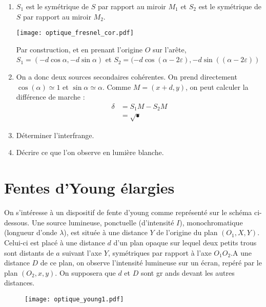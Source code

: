 \begin{correction}

\begin{enumerate}

	\item $S_1$ est le symétrique de $S$ par rapport au miroir $M_1$ et $S_2$ est le symétrique de $S$ par rapport au miroir $M_2$. 
	
\texttt{[image: optique\_fresnel\_cor.pdf]}

Par construction, et en prenant l'origine $O$ sur l'arête, $S_1=(-d\cos\alpha,-d\sin\alpha)$ et $S_2=(-d\cos(\alpha-2\varepsilon),-d\sin((\alpha-2\varepsilon))$
	
	\item On a donc deux sources secondaires cohérentes. On prend directement $\cos(\alpha)\simeq1$ et $\sin\alpha\simeq\alpha$. Comme $M=(x+d,y)$, on peut calculer la différence de marche :
	\begin{align*}
		\delta &= S_1M-S_2M \\
		&=\sqrt{•}
	\end{align*}
	
	\item Déterminer l'interfrange.
	
	\item Décrire ce que l'on observe en lumière blanche.

\end{enumerate}

\end{correction}

\newpage

\section{Fentes d'Young élargies}

On s'intéresse à un dispositif de fente d'young comme représenté sur le schéma ci-dessous. Une source lumineuse, ponctuelle (d'intensité $I$), monochromatique (longueur d'onde $\lambda$), est située à une distance $Y$ de l'origine du plan $(O_1,X,Y)$. Celui-ci est placé à une distance $d$ d'un plan opaque sur lequel deux petits trous sont distants de $a$ suivant l'axe $Y$, symétriques par rapport à l'axe $O_1O_2$.A une distance $D$ de ce plan, on observe l'intensité lumineuse sur un écran, repéré par le plan $(O_2,x,y)$. On supposera que $d$ et $D$ sont gr	ands devant les autres distances.

\begin{figure}[h]
\centering
  \texttt{[image: optique\_young1.pdf]}
\end{figure}

